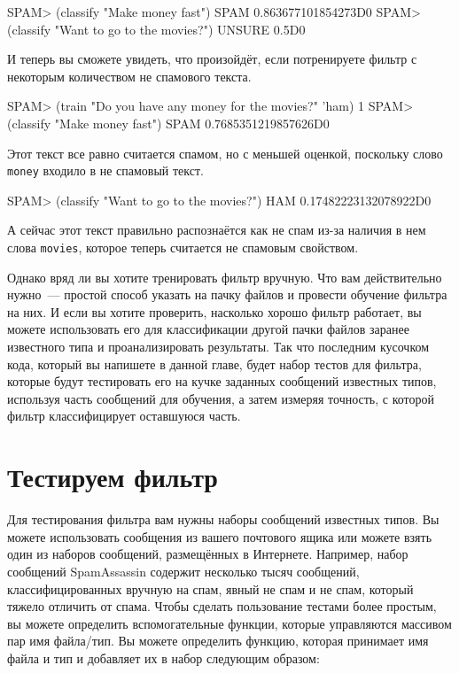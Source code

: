 \begin{myverb}
SPAM> (classify "Make money fast")
SPAM
0.863677101854273D0
SPAM> (classify "Want to go to the movies?")
UNSURE
0.5D0
\end{myverb}

И теперь вы сможете увидеть, что произойдёт, если потренируете фильтр с некоторым
количеством не спамового текста.

\begin{myverb}
SPAM> (train "Do you have any money for the movies?" 'ham)
1
SPAM> (classify "Make money fast")
SPAM
0.7685351219857626D0
\end{myverb}

Этот текст все равно считается спамом, но с меньшей оценкой, поскольку слово \lstinline{money}
входило в не спамовый текст.

\begin{myverb}
SPAM> (classify "Want to go to the movies?")
HAM
0.17482223132078922D0
\end{myverb}

А сейчас этот текст правильно распознаётся как не спам из-за наличия в нем слова
\lstinline{movies}, которое теперь считается не спамовым свойством.

Однако вряд ли вы хотите тренировать фильтр вручную.  Что вам действительно нужно~---
простой способ указать на пачку файлов и провести обучение фильтра на них.  И если вы
хотите проверить, насколько хорошо фильтр работает, вы можете использовать его для
классификации другой пачки файлов заранее известного типа и проанализировать результаты.
Так что последним кусочком кода, который вы напишете в данной главе, будет набор тестов
для фильтра, которые будут тестировать его на кучке заданных сообщений известных типов,
используя часть сообщений для обучения, а затем измеряя точность, с которой фильтр
классифицирует оставшуюся часть.

\section{Тестируем фильтр}

Для тестирования фильтра вам нужны наборы сообщений известных типов.  Вы можете
использовать сообщения из вашего почтового ящика или можете взять один из наборов
сообщений, размещённых в Интернете.  Например, набор сообщений
SpamAssassin содержит несколько
тысяч сообщений, классифицированных вручную на спам, явный не спам и не спам, который
тяжело отличить от спама.  Чтобы сделать пользование тестами более простым, вы можете
определить вспомогательные функции, которые управляются массивом пар имя файла/тип.  Вы
можете определить функцию, которая принимает имя файла и тип и добавляет их в набор
следующим образом:

